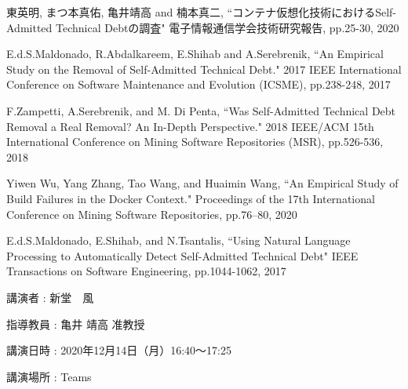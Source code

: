 \documentclass[a4j,10pt,a4paper, fleqn]{jsarticle}\usepackage{stylefile}
\begin{document}
\begin{thebibliography}{9}

\vspace{-3mm}

東英明, まつ本真佑, 亀井靖高 and 楠本真二, ``コンテナ仮想化技術におけるSelf-Admitted Technical Debtの調査" 電子情報通信学会技術研究報告, pp.25-30, 2020

E.d.S.Maldonado, R.Abdalkareem, E.Shihab and A.Serebrenik, ``An Empirical Study on the Removal of Self-Admitted Technical Debt." 2017 IEEE International Conference on Software Maintenance and Evolution (ICSME), pp.238-248, 2017

F.Zampetti, A.Serebrenik, and M. Di Penta, ``Was Self-Admitted Technical Debt Removal a Real Removal? An In-Depth Perspective." 2018 IEEE/ACM 15th International Conference on Mining Software Repositories (MSR), pp.526-536, 2018

Yiwen Wu, Yang Zhang, Tao Wang, and Huaimin Wang, ``An Empirical Study of Build Failures in the Docker Context." Proceedings of the 17th International Conference on Mining Software Repositories, pp.76–80, 2020

E.d.S.Maldonado, E.Shihab, and N.Tsantalis, ``Using Natural Language Processing to Automatically Detect Self-Admitted Technical Debt" IEEE Transactions on Software Engineering, pp.1044-1062, 2017





\end{thebibliography}
\vspace{-5mm}

\begin{list}{}{ \itemindent=8mm}
	\renewcommand{\makelabel}{\normalsize}
	\item[\quad 講演者\hfill]: 新堂　風 
	\item[\quad 指導教員\hfill]: 亀井 靖高 准教授
	\item[\quad 講演日時\hfill]: 2020年12月14日（月）16:40～17:25
	\item[\quad 講演場所\hfill]: Teams
\end{list}
\end{document}
